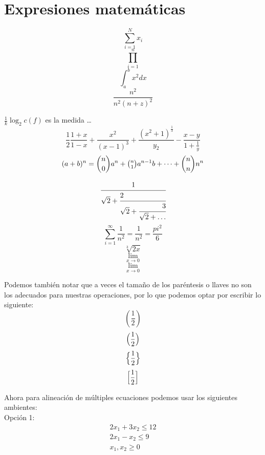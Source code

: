 \documentclass[12pt]{article}
\begin{document}
\newpage

\section*{\\Expresiones matemáticas}
$$ \sum_{i=1}^{N} x_i$$
$$ \prod_{i=1}^{n}$$
\[\int_a^b x^2 dx\] %
\[\dfrac{n^2}{n^2(n+z)^2}\]

$\frac{1}{k} \log_{2} c(f)$ es la medida \dots
\[\frac{1}{2}\frac{1+x}{1-x}+\frac{x^2}{(x-1)^3}+\frac{(x^2+1)^{\frac{1}{3}}}{y_2}-\frac{x-y}{1+\frac{1}{y}}\]
\[(a+b)^{n}=\binom{n}{0} a^{n}+\tbinom{n}{1}a^{n-1}b+ \dots + \binom{n}{n}n^n\]

\[ \cfrac{1}{\sqrt{2}+ \cfrac[l]{2}{\sqrt{2}+ \cfrac[r]{3}{\sqrt{2}+ \dots }}} \]
\[\sum_{i=1}^\infty \frac{1}{n^2}=\frac{1}{n^2}=\frac{pi^2}{6}\]
$$\sqrt[3]{2x}$$
\[\lim_{x \to 0}\] %
\[\underset{x\to 0}{\lim}\] %
\par 
Podemos también notar que a veces el tamaño de los paréntesis o llaves no son los adecuados para nuestras operaciones, por lo que podemos optar por escribir lo siguiente:
\[(\frac{1}{2})\]
\[\Bigl(\frac{1}{2} \Bigr)\]
\[\Bigl\{\frac{1}{2} \Bigr\}\]
\[\Bigl[\frac{1}{2} \Bigr]\]
\par
Ahora para alineación de múltiples ecuaciones podemos usar los siguientes ambientes:\\
Opción 1:
\begin{gather}
    2x_{1}+3x_{2}\leq 12\\
    2x_{1} - x_{2} \leq 9 \nonumber \\
    x_{1},x_{2} \geq 0
\end{gather}
\end{document}

